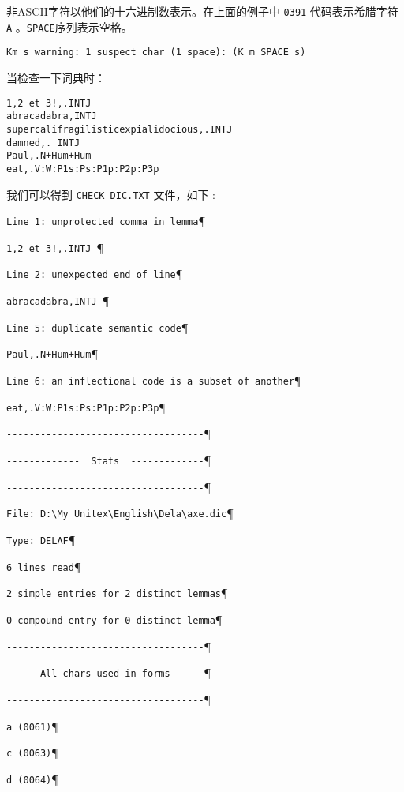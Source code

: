 \bigskip
\noindent
非ASCII字符以他们的十六进制数表示。在上面的例子中 \verb+0391+ 代码表示希腊字符 \verb+A+ 。\verb+SPACE+序列表示空格。


\begin{verbatim}
Km s warning: 1 suspect char (1 space): (K m SPACE s)
\end{verbatim}

\bigskip
\noindent

当检查一下词典时：


\begin{verbatim}
1,2 et 3!,.INTJ 
abracadabra,INTJ 
supercalifragilisticexpialidocious,.INTJ
damned,. INTJ
Paul,.N+Hum+Hum
eat,.V:W:P1s:Ps:P1p:P2p:P3p
\end{verbatim}

\bigskip
\noindent 我们可以得到 \verb+CHECK_DIC.TXT+ 文件，如下 :

\bigskip
\verb$Line 1: unprotected comma in lemma$\P

\verb$1,2 et 3!,.INTJ $\P

\verb$Line 2: unexpected end of line$\P

\verb$abracadabra,INTJ $\P

\verb$Line 5: duplicate semantic code$\P

\verb$Paul,.N+Hum+Hum$\P

\verb$Line 6: an inflectional code is a subset of another$\P

\verb$eat,.V:W:P1s:Ps:P1p:P2p:P3p$\P

\verb$-----------------------------------$\P

\verb$-------------  Stats  -------------$\P

\verb$-----------------------------------$\P

\verb$File: D:\My Unitex\English\Dela\axe.dic$\P

\verb$Type: DELAF$\P

\verb$6 lines read$\P

\verb$2 simple entries for 2 distinct lemmas$\P

\verb$0 compound entry for 0 distinct lemma$\P

\verb$-----------------------------------$\P

\verb$----  All chars used in forms  ----$\P

\verb$-----------------------------------$\P

\verb$a (0061)$\P

\verb$c (0063)$\P

\verb$d (0064)$\P

